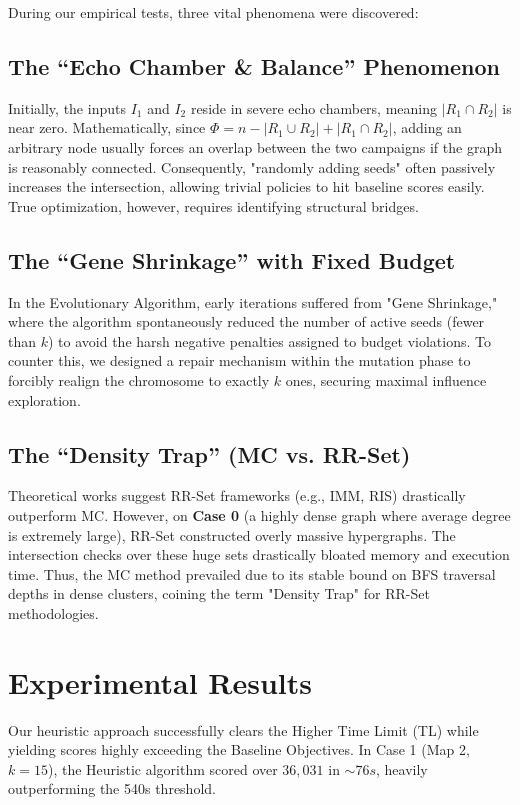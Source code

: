 \documentclass[conference]{IEEEtran}
\begin{document}
During our empirical tests, three vital phenomena were discovered:

\subsection{The ``Echo Chamber \& Balance'' Phenomenon}
Initially, the inputs $I_1$ and $I_2$ reside in severe echo chambers, meaning $|R_1 \cap R_2|$ is near zero. Mathematically, since $\Phi = n - |R_1 \cup R_2| + |R_1 \cap R_2|$, adding an arbitrary node usually forces an overlap between the two campaigns if the graph is reasonably connected. Consequently, "randomly adding seeds" often passively increases the intersection, allowing trivial policies to hit baseline scores easily. True optimization, however, requires identifying structural bridges.

\subsection{The ``Gene Shrinkage'' with Fixed Budget}
In the Evolutionary Algorithm, early iterations suffered from "Gene Shrinkage," where the algorithm spontaneously reduced the number of active seeds (fewer than $k$) to avoid the harsh negative penalties assigned to budget violations. To counter this, we designed a repair mechanism within the mutation phase to forcibly realign the chromosome to exactly $k$ ones, securing maximal influence exploration.

\subsection{The ``Density Trap'' (MC vs. RR-Set)}
Theoretical works suggest RR-Set frameworks (e.g., IMM, RIS) drastically outperform MC. However, on \textbf{Case 0} (a highly dense graph where average degree is extremely large), RR-Set constructed overly massive hypergraphs. The intersection checks over these huge sets drastically bloated memory and execution time. Thus, the MC method prevailed due to its stable bound on BFS traversal depths in dense clusters, coining the term "Density Trap" for RR-Set methodologies.

\section{Experimental Results}
Our heuristic approach successfully clears the Higher Time Limit (TL) while yielding scores highly exceeding the Baseline Objectives. In Case 1 (Map 2, $k=15$), the Heuristic algorithm scored over $36,031$ in $\sim 76s$, heavily outperforming the 540s threshold. 
\end{document}
